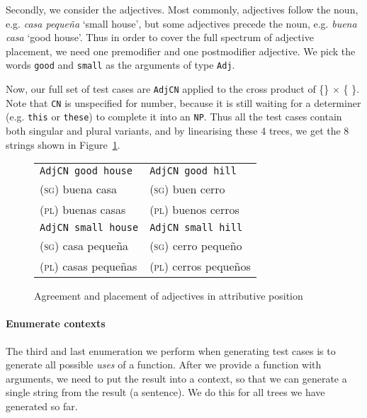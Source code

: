 \documentclass[11pt]{article}
\def\t#1{\texttt{#1}}
\begin{document}
Secondly, we consider the adjectives. Most commonly, adjectives follow
the noun, e.g. \emph{casa peque\~{n}a} `small house', but some
adjectives precede the noun, e.g. \emph{buena casa} `good house'. Thus 
in order to cover the full spectrum of adjective placement, we need
one premodifier and one postmodifier adjective. We pick the words
\t{good} and \t{small} as the arguments of type \t{Adj}. 

Now, our full set of test cases are \t{AdjCN} applied to the cross
product of \{\}
$\times$ \{ \}.
Note that \t{CN} is unspecified for number, because it is still waiting for a
determiner (e.g. \t{this} or \t{these}) to complete it into an
\t{NP}. Thus all the test cases contain both singular and plural
variants, and by linearising these 4 trees, we get the 8 strings shown
in Figure~\ref{fig:adjAttr}.

\begin{figure}
\centering
\centering
\begin{tabular}{| l | l |}
\hline
\t{AdjCN good house}   & \t{AdjCN good hill} \\ 
\textsc{(sg)} buena casa             & \textsc{(sg)} buen cerro \\
\textsc{(pl)} buenas casas           & \textsc{(pl)} buenos cerros \\ \hline

\t{AdjCN small house}   & \t{AdjCN small hill} \\ 
\textsc{(sg)} casa  peque\~{n}a            & \textsc{(sg)} cerro  peque\~{n}o \\
\textsc{(pl)} casas  peque\~{n}as          & \textsc{(pl)} cerros  peque\~{n}os \\ \hline
\end{tabular}
\caption{Agreement and placement of adjectives in attributive position}
\label{fig:adjAttr}
\end{figure}

\paragraph{Enumerate contexts} The third and last enumeration we perform when generating test cases is to generate all possible \emph{uses} of a function. After we provide a function with arguments, we need to put the result into a context, so that we can generate a single string from the result (a sentence). We do this for all trees we have generated so far.
\end{document}
